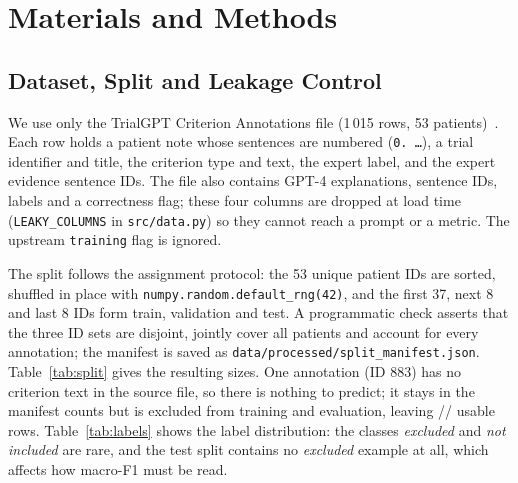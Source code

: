 \section{Materials and Methods}

\subsection{Dataset, Split and Leakage Control}
We use only the TrialGPT Criterion Annotations file (1\,015 rows, 53 patients)~\cite{ncbi2024dataset}. Each row holds a patient note whose sentences are numbered (\texttt{0. \ldots}), a trial identifier and title, the criterion type and text, the expert label, and the expert evidence sentence IDs. The file also contains GPT-4 explanations, sentence IDs, labels and a correctness flag; these four columns are dropped at load time (\texttt{LEAKY\_COLUMNS} in \texttt{src/data.py}) so they cannot reach a prompt or a metric. The upstream \texttt{training} flag is ignored.

The split follows the assignment protocol: the 53 unique patient IDs are sorted, shuffled in place with \texttt{numpy.random.default\_rng(42)}, and the first 37, next 8 and last 8 IDs form train, validation and test. A programmatic check asserts that the three ID sets are disjoint, jointly cover all patients and account for every annotation; the manifest is saved as \texttt{data/processed/split\_manifest.json}. Table~\ref{tab:split} gives the resulting sizes. One annotation (ID 883) has no criterion text in the source file, so there is nothing to predict; it stays in the manifest counts but is excluded from training and evaluation, leaving \NTrain/\NVal/\NTest{} usable rows. Table~\ref{tab:labels} shows the label distribution: the classes \emph{excluded} and \emph{not included} are rare, and the test split contains no \emph{excluded} example at all, which affects how macro-F1 must be read.

\begin{table}[t]\centering\caption{Patient-grouped split (seed 42).}\label{tab:split}
\small\end{table}
\begin{table}[t]\centering\caption{Expert label distribution per split (usable rows).}\label{tab:labels}
\small\end{table}

